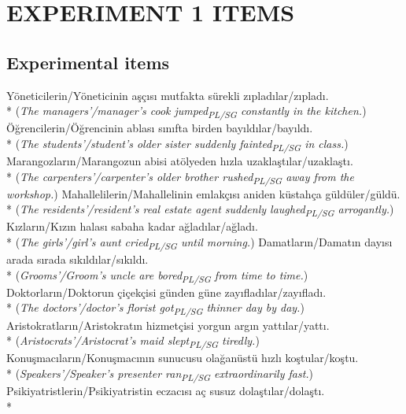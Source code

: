 
\chapter{EXPERIMENT 1 ITEMS} \label{ap:exp1items}

\section{Experimental items}

\ea Y\"{o}neticilerin/Y\"{o}neticinin a\c{s}\c{c}{\i}s{\i} mutfakta s\"{u}rekli z{\i}plad{\i}lar/z{\i}plad{\i}. \\* 
({\it The managers'/manager's cook jumped\textsubscript{PL/SG} constantly in the kitchen.})
\ex \"{O}\u{g}rencilerin/\"{O}\u{g}rencinin ablas{\i} s{\i}n{\i}fta birden bay{\i}ld{\i}lar/bay{\i}ld{\i}. \\* 
({\it The students'/student's older sister suddenly fainted\textsubscript{PL/SG} in class.})
\ex Marangozlar{\i}n/Marangozun abisi at\"{o}lyeden h{\i}zla uzakla\c{s}t{\i}lar/uzakla\c{s}t{\i}.\\* 
({\it The carpenters'/carpenter's older brother rushed\textsubscript{PL/SG} away from the workshop.})
\ex Mahallelilerin/Mahallelinin emlak\c{c}{\i}s{\i} aniden k\"{u}stah\c{c}a g\"{u}ld\"{u}ler/g\"{u}ld\"{u}.\\* 
({\it The residents'/resident's real estate agent suddenly laughed\textsubscript{PL/SG} arrogantly.})
\ex K{\i}zlar{\i}n/K{\i}z{\i}n halas{\i} sabaha kadar a\u{g}lad{\i}lar/a\u{g}lad{\i}.\\* 
({\it The girls'/girl's aunt cried\textsubscript{PL/SG} until morning.})
\ex Damatlar{\i}n/Damat{\i}n day{\i}s{\i} arada s{\i}rada s{\i}k{\i}ld{\i}lar/s{\i}k{\i}ld{\i}.\\* 
({\it Grooms'/Groom's uncle are bored\textsubscript{PL/SG} from time to time.})
\ex Doktorlar{\i}n/Doktorun \c{c}i\c{c}ek\c{c}isi g\"{u}nden g\"{u}ne zay{\i}flad{\i}lar/zay{\i}flad{\i}.\\* 
({\it The doctors'/doctor's florist got\textsubscript{PL/SG} thinner day by day.})
\ex Aristokratlar{\i}n/Aristokrat{\i}n hizmet\c{c}isi yorgun arg{\i}n yatt{\i}lar/yatt{\i}.\\*
({\it Aristocrats'/Aristocrat's maid slept\textsubscript{PL/SG} tiredly.})
\ex Konu\c{s}mac{\i}lar{\i}n/Konu\c{s}mac{\i}n{\i}n sunucusu ola\u{g}an\"{u}st\"{u} h{\i}zl{\i} ko\c{s}tular/ko\c{s}tu.\\*
({\it Speakers'/Speaker's presenter ran\textsubscript{PL/SG} extraordinarily fast.})
\ex Psikiyatristlerin/Psikiyatristin eczac{\i}s{\i} a\c{c} susuz dola\c{s}t{\i}lar/dola\c{s}t{\i}.\\*
